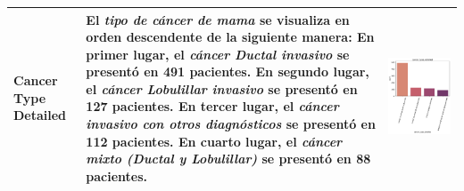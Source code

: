 \begin{table}[!htb]
\begin{threeparttable}
\begin{tabular}{p{2.5cm} p{7.5cm} p{6.5cm}}
			\\ \hline
			Cancer Type Detailed
			& El \textit{tipo de cáncer de mama} se visualiza en orden descendente de la siguiente manera: En primer lugar, el \textit{cáncer Ductal invasivo} se presentó en 491 pacientes. En segundo lugar, el \textit{cáncer Lobulillar invasivo} se presentó en 127 pacientes. En tercer lugar, el \textit{cáncer invasivo con otros diagnósticos} se presentó en 112 pacientes. En cuarto lugar,  el \textit{cáncer mixto (Ductal y Lobulillar)} se presentó en 88 pacientes.
			
			& \begin{center}\includegraphics[width=1\linewidth]{NOTEBOOK/IMAGENES_DESCRIPTIVAS/6_cancer_type_detailed}\end{center}
			\\ \hline
		\end{tabular}
	\end{threeparttable}
\end{table}

